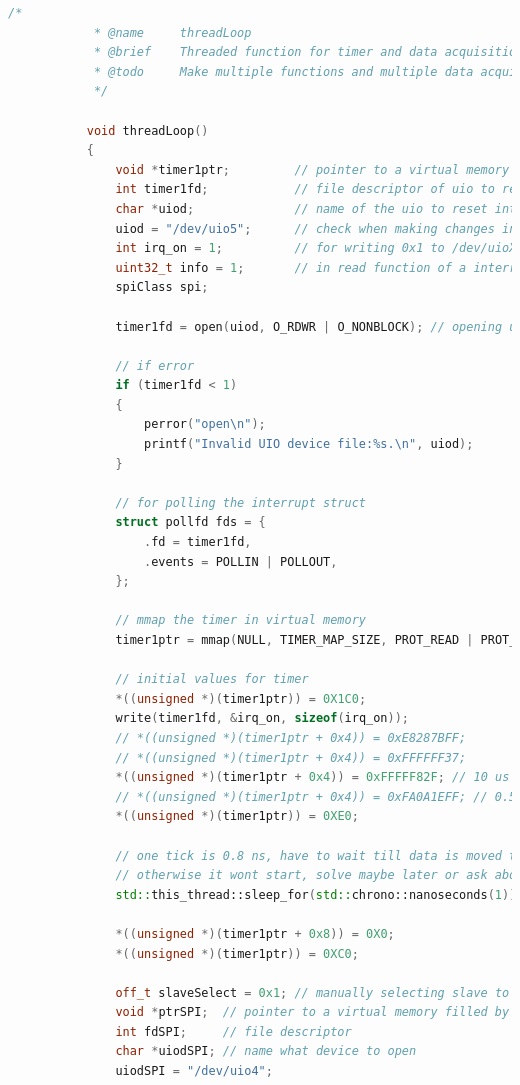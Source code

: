\documentclass[a4paper, twoside, 11pt]{article}
\begin{document}
		\begin{lstlisting}[language={c++}, caption={threadLoop() funkce, běžící ve vlákně backgroundThread.}, label={lst:thread-loop-code}]
			/*
			* @name     threadLoop
			* @brief    Threaded function for timer and data acquisition.
			* @todo     Make multiple functions and multiple data acquisitions paralel but use data only when data from all sources all valid.
			*/
		   
		   void threadLoop()
		   {
			   void *timer1ptr;         // pointer to a virtual memory filled by mmap
			   int timer1fd;            // file descriptor of uio to reset interrupt in /proc/interrupts
			   char *uiod;              // name of the uio to reset interrupts
			   uiod = "/dev/uio5";      // check when making changes in a platform
			   int irq_on = 1;          // for writing 0x1 to /dev/uioX
			   uint32_t info = 1;       // in read function of a interrupt checking
			   spiClass spi;

			   timer1fd = open(uiod, O_RDWR | O_NONBLOCK); // opening uioX device
		   
			   // if error
			   if (timer1fd < 1)
			   {
				   perror("open\n");
				   printf("Invalid UIO device file:%s.\n", uiod);
			   }
		   
			   // for polling the interrupt struct
			   struct pollfd fds = {
				   .fd = timer1fd,
				   .events = POLLIN | POLLOUT,
			   };
		   
			   // mmap the timer in virtual memory
			   timer1ptr = mmap(NULL, TIMER_MAP_SIZE, PROT_READ | PROT_WRITE, MAP_SHARED, timer1fd, 0);
		   
			   // initial values for timer
			   *((unsigned *)(timer1ptr)) = 0X1C0;
			   write(timer1fd, &irq_on, sizeof(irq_on));
			   // *((unsigned *)(timer1ptr + 0x4)) = 0xE8287BFF;
			   // *((unsigned *)(timer1ptr + 0x4)) = 0xFFFFFF37;
			   *((unsigned *)(timer1ptr + 0x4)) = 0xFFFFF82F; // 10 us
			   // *((unsigned *)(timer1ptr + 0x4)) = 0xFA0A1EFF; // 0.5s
			   *((unsigned *)(timer1ptr)) = 0XE0;
		   
			   // one tick is 0.8 ns, have to wait till data is moved to counter register
			   // otherwise it wont start, solve maybe later or ask about it
			   std::this_thread::sleep_for(std::chrono::nanoseconds(1));
		   
			   *((unsigned *)(timer1ptr + 0x8)) = 0X0;
			   *((unsigned *)(timer1ptr)) = 0XC0;
		   
			   off_t slaveSelect = 0x1; // manually selecting slave to make active
			   void *ptrSPI;  // pointer to a virtual memory filled by mmap
			   int fdSPI;     // file descriptor
			   char *uiodSPI; // name what device to open
			   uiodSPI = "/dev/uio4";
		   

\end{lstlisting}
\end{document}
